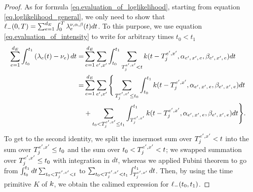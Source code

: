 \documentclass[10pt, article,table]{article}
\begin{document}
\begin{proof}
As for formula \eqref{eq.evaluation_of_loglikelihood}, starting from equation \eqref{eq.loglikelihood_general}, we only need to show that $\lminus(0,\timeHorizon) = \sum_{e=1}^{\numEventTypes} \int_{0}^{\timeHorizon}\intensity^{\nu,\impCoef, \decCoef}(t)dt$. To this purpose, we use equation \eqref{eq.evaluation_of_intensity} to write for arbitrary times $t_0<t_1$
\begin{equation*}
\begin{split}
\sum_{e=1}^{\numEventTypes}\int_{t_0}^{t_1} \left(\intensity[e](t) - \baseRate_e \right) dt 
=&
\sum_{e=1}^{\numEventTypes}\sum_{\eone,\xone}\int_{t_0}^{t_1} 
\sum_{\arrivalTimes[\eone,\xone]_j <t} \parametricHawkesKernel(t-\arrivalTimes[\eone,\xone]_j, \impCoef\subscriptexe, \decCoef\subscriptexe)dt 
\\
=&
\sum_{e=1}^{\numEventTypes}\sum_{\eone,\xone}
\Bigg\lbrace
\sum_{\arrivalTimes[\eone,\xone]_j \leq t_0}
\int_{t_0}^{t_1} 
\parametricHawkesKernel(t-\arrivalTimes[\eone,\xone]_j, \impCoef\subscriptexe, \decCoef\subscriptexe)dt 
\\
&+
\sum_{t_0<\arrivalTimes[\eone,\xone]_j \leq t_1}
\int_{\arrivalTimes[\eone,\xone]_j}^{t_1} \parametricHawkesKernel(t-\arrivalTimes[\eone,\xone]_j, \impCoef\subscriptexe, \decCoef\subscriptexe)dt 
\Bigg\rbrace.
\end{split}
\end{equation*}
To get to the second identity, we split the innermost sum over $\arrivalTimes[\eone,\xone]_j<t$ into the sum over $\arrivalTimes[\eone,\xone]_j \leq t_0$ and the sum over $t_0 < \arrivalTimes[\eone,\xone]_j<t$;  we swapped summation over  $\arrivalTimes[\eone,\xone]_j \leq t_0$ with integration in $dt$, whereas we applied Fubini theorem to go from $\int_{t_0}^{t_1}dt\sum_{t_0 < \arrivalTimes[\eone,\xone]_j<t}$ to $\sum_{t_0 < \arrivalTimes[\eone,\xone]_j<t_1}\int_{\arrivalTimes[\eone,\xone]_j}^{t_1}dt$. Then, by using the time primitive $K$ of $\parametricHawkesKernel$, we obtain the calimed expression for $\lminus(t_0,t_1)$.
\end{proof}
\end{document}
